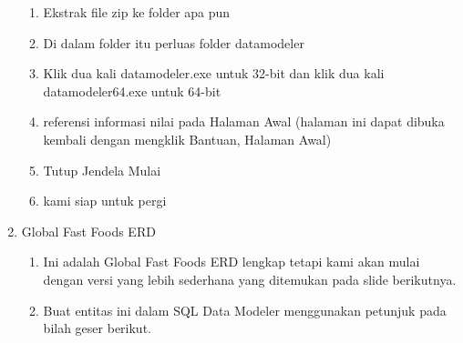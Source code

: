 \documentclass [12pt, times new roman, a4paper]{article}
\begin{document}
\begin{enumerate}
\begin{enumerate}
\item Ekstrak file zip ke folder apa pun
\item Di dalam folder itu perluas folder datamodeler
\item Klik dua kali datamodeler.exe untuk 32-bit dan klik dua kali datamodeler64.exe untuk 64-bit
\item referensi informasi nilai pada Halaman Awal (halaman ini dapat dibuka kembali dengan mengklik Bantuan, Halaman Awal)
\item Tutup Jendela Mulai
\item kami siap untuk pergi
\end{enumerate}
\item Global Fast Foods ERD
\begin{enumerate}
\item Ini adalah Global Fast Foods ERD lengkap tetapi kami akan mulai dengan versi yang lebih sederhana yang ditemukan pada slide berikutnya.
\item Buat entitas ini dalam SQL Data Modeler menggunakan petunjuk pada bilah geser berikut.
\end{enumerate}
\end{enumerate}
\end{document}
